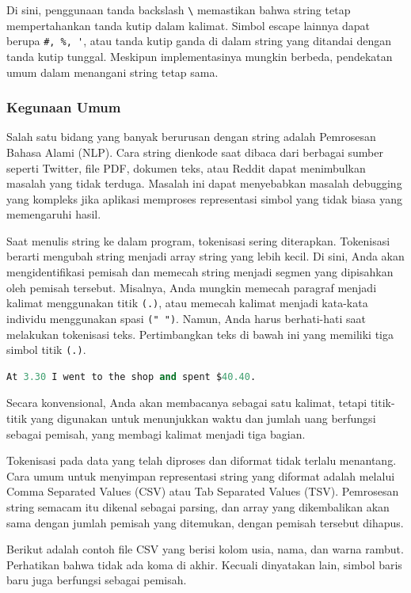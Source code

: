 \documentclass{article}
\begin{document}
Di sini, penggunaan tanda backslash \verb|\| memastikan bahwa string tetap mempertahankan tanda kutip dalam kalimat. Simbol escape lainnya dapat berupa \verb|#, %, '|, atau tanda kutip ganda di dalam string yang ditandai dengan tanda kutip tunggal. Meskipun implementasinya mungkin berbeda, pendekatan umum dalam menangani string tetap sama.

\subsubsection{Kegunaan Umum}
Salah satu bidang yang banyak berurusan dengan string adalah Pemrosesan Bahasa Alami (NLP). Cara string dienkode saat dibaca dari berbagai sumber seperti Twitter, file PDF, dokumen teks, atau Reddit dapat menimbulkan masalah yang tidak terduga. Masalah ini dapat menyebabkan masalah debugging yang kompleks jika aplikasi memproses representasi simbol yang tidak biasa yang memengaruhi hasil.

Saat menulis string ke dalam program, tokenisasi sering diterapkan. Tokenisasi berarti mengubah string menjadi array string yang lebih kecil. Di sini, Anda akan mengidentifikasi pemisah dan memecah string menjadi segmen yang dipisahkan oleh pemisah tersebut. Misalnya, Anda mungkin memecah paragraf menjadi kalimat menggunakan titik \verb|(.)|, atau memecah kalimat menjadi kata-kata individu menggunakan spasi \verb|(" ")|. Namun, Anda harus berhati-hati saat melakukan tokenisasi teks. Pertimbangkan teks di bawah ini yang memiliki tiga simbol titik \verb|(.)|.
\begin{lstlisting}[language=Python, caption={}, captionpos=b]
At 3.30 I went to the shop and spent $40.40.  
\end{lstlisting}

Secara konvensional, Anda akan membacanya sebagai satu kalimat, tetapi titik-titik yang digunakan untuk menunjukkan waktu dan jumlah uang berfungsi sebagai pemisah, yang membagi kalimat menjadi tiga bagian.

Tokenisasi pada data yang telah diproses dan diformat tidak terlalu menantang. Cara umum untuk menyimpan representasi string yang diformat adalah melalui Comma Separated Values (CSV) atau Tab Separated Values (TSV). Pemrosesan string semacam itu dikenal sebagai parsing, dan array yang dikembalikan akan sama dengan jumlah pemisah yang ditemukan, dengan pemisah tersebut dihapus.

Berikut adalah contoh file CSV yang berisi kolom usia, nama, dan warna rambut. Perhatikan bahwa tidak ada koma di akhir. Kecuali dinyatakan lain, simbol baris baru juga berfungsi sebagai pemisah.
\end{document}
